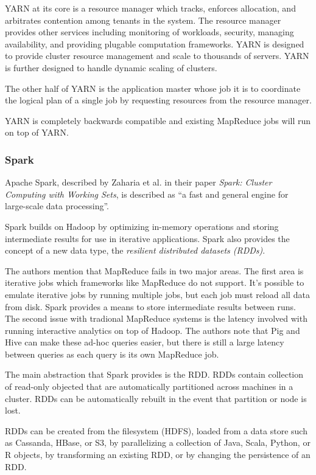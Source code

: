 \documentclass[]{article}
\begin{document}
YARN at its core is a resource manager which tracks, enforces allocation, and arbitrates contention among tenants in the system. The resource manager provides other services including monitoring of workloads, security, managing availability, and providing plugable computation frameworks. YARN is designed to provide cluster resource management and scale to thousands of servers. YARN is further designed to handle dynamic scaling of clusters.

The other half of YARN is the application master whose job it is to coordinate the logical plan of a single job by requesting resources from the resource manager.

YARN is completely backwards compatible and existing MapReduce jobs will run on top of YARN.

\subsubsection{Spark}
Apache Spark, described by Zaharia et al. in their paper \textit{Spark: Cluster Computing with Working Sets}\cite{zaharia_spark:_2010}, is described as ``a fast and general engine for large-scale data processing''.

Spark builds on Hadoop by optimizing in-memory operations and storing intermediate results for use in iterative applications. Spark also provides the concept of a new data type, the \textit{resilient distributed datasets (RDDs)}.

The authors mention that MapReduce fails in two major areas. The first area is iterative jobs which frameworks like MapReduce do not support. It's possible to emulate iterative jobs by running multiple jobs, but each job must reload all data from disk. Spark provides a means to store intermediate results between runs. The second issue with tradional MapReduce systems is the latency involved with running interactive analytics on top of Hadoop. The authors note that Pig and Hive can make these ad-hoc queries easier, but there is still a large latency between queries as each query is its own MapReduce job.

The main abstraction that Spark provides is the RDD. RDDs contain collection of read-only objected that are automatically partitioned across machines in a cluster. RDDs can be automatically rebuilt in the event that partition or node is lost. 

RDDs can be created from the filesystem (HDFS), loaded from a data store such as Cassanda, HBase, or S3, by parallelizing a collection of Java, Scala, Python, or R objects, by transforming an existing RDD, or by changing the persistence of an RDD. 
\end{document}
